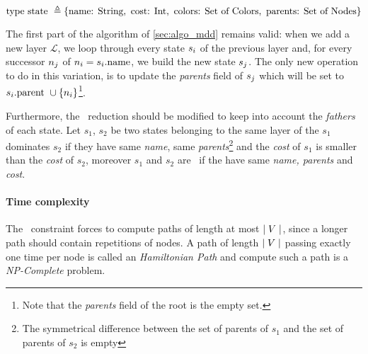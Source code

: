 \begin{equation}
  \label{eq:record2}
  \text{type state } \triangleq \{\text{name: } \text{String}, \text{ cost: } \text{Int}, \text{ colors: } \text{Set of Colors}, \text{ parents: } \text{Set of Nodes} \}
\end{equation}

The first part of the algorithm of \cref{sec:algo_mdd} remains valid: when we add a new layer $\mathcal{L}$, we loop through every state $s_i$ of the previous layer and, for every successor $n_j$ of $n_i = s_i\text{.name}$, we build the new state $s_j$. The only new operation to do in this variation, is to update the \textit{parents} field of $s_j$ which will be set to $s_i\text{.parent } \cup \{n_i\}$\footnote{Note that the \textit{parents} field of the root is the empty set.}.

Furthermore, the \mdd\ reduction should be modified to keep into account the \textit{fathers} of each state. Let $s_1$, $s_2$ be two states belonging to the same layer of the \mdd\; $s_1$ dominates $s_2$ if they have same \textit{name}, same \textit{parents}\footnote{The symmetrical difference between the set of parents of $s_1$ and the set of parents of $s_2$ is empty} and the \textit{cost} of $s_1$ is smaller than the \textit{cost} of $s_2$, moreover $s_1$ and $s_2$ are \compatibleState\ if the have same \textit{name, parents} and \textit{cost}.

\paragraph{Time complexity} The \alldiff\ constraint forces to compute paths of length at most $\mid V \mid$, since a longer path should contain repetitions of nodes. A path of length $\mid V \mid$ passing exactly one time per node is called an \textit{Hamiltonian Path} and compute such a path is a \textit{NP-Complete} problem.

